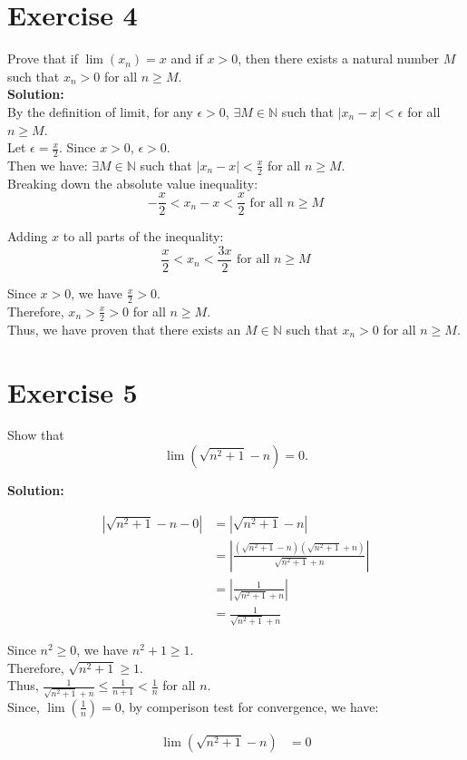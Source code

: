 \documentclass{article}
\begin{document}
\newpage

\section*{Exercise 4}
Prove that if $\lim(x_n) = x$ and if $x > 0$, then there exists a natural number $M$ such that $x_n > 0$ for all $n \geq M$. \\

\textbf{Solution:} \\

By the definition of limit, for any $\epsilon > 0$, 
$\exists M \in \mathbb{N}$ such that $|x_n - x| < \epsilon$ for all $n \geq M$. \\

Let $\epsilon = \frac{x}{2}$. Since $x > 0$, $\epsilon > 0$. \\

Then we have:
$\exists M \in \mathbb{N}$ such that $|x_n - x| < \frac{x}{2}$ for all $n \geq M$. \\

Breaking down the absolute value inequality:
$$-\frac{x}{2} < x_n - x < \frac{x}{2} \text{ for all } n \geq M$$

Adding $x$ to all parts of the inequality:
$$\frac{x}{2} < x_n < \frac{3x}{2} \text{ for all } n \geq M$$

Since $x > 0$, we have $\frac{x}{2} > 0$. \\

Therefore, $x_n > \frac{x}{2} > 0$ for all $n \geq M$. \\

Thus, we have proven that there exists an $M \in \mathbb{N}$ such that $x_n > 0$ for all $n \geq M$.

\newpage

\section*{Exercise 5}
Show that
\[\lim\left(\sqrt{n^2 + 1} - n\right) = 0.\]

\textbf{Solution:}

\begin{align*}
|\sqrt{n^2 + 1} - n - 0| &= |\sqrt{n^2 + 1} - n| \\
&= \left|\frac{(\sqrt{n^2 + 1} - n)(\sqrt{n^2 + 1} + n)}{\sqrt{n^2 + 1} + n}\right| \\
&= \left|\frac{1}{\sqrt{n^2 + 1} + n}\right| \\
&= \frac{1}{\sqrt{n^2 + 1} + n}
\end{align*}

Since $n^2 \geq 0$, we have $n^2 + 1 \geq 1$. \\

Therefore, $\sqrt{n^2 + 1} \geq 1$. \\

Thus, $\frac{1}{\sqrt{n^2 + 1} + n} \leq \frac{1}{n+1} < \frac{1}{n}$ for all $n$. \\

Since, $\lim\left(\frac{1}{n}\right) = 0$, by comperison test for convergence, we have:

\begin{align*}
\lim\left(\sqrt{n^2 + 1} - n\right) &= 0
\end{align*}
\end{document}
